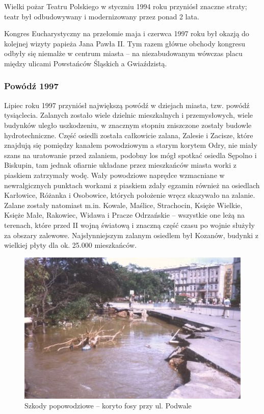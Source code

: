 \documentclass{article}
\begin{document}
Wielki pożar Teatru Polskiego w styczniu 1994 roku przyniósł znaczne straty; teatr był odbudowywany i modernizowany przez ponad 2 lata.

Kongres Eucharystyczny na przełomie maja i czerwca 1997 roku był okazją do kolejnej wizyty papieża Jana Pawła II. Tym razem główne obchody kongresu odbyły się niemalże w centrum miasta – na niezabudowanym wówczas placu między ulicami Powstańców Śląskich a Gwiaździstą.

\subsubsection{Powódź 1997}
Lipiec roku 1997 przyniósł największą powódź w dziejach miasta, tzw. powódź tysiąclecia. Zalanych zostało wiele dzielnic mieszkalnych i przemysłowych, wiele budynków uległo uszkodzeniu, w znacznym stopniu zniszczone zostały budowle hydrotechniczne. Część osiedli została całkowicie zalana, Zalesie i Zacisze, które znajdują się pomiędzy kanałem powodziowym a starym korytem Odry, nie miały szans na uratowanie przed zalaniem, podobny los mógł spotkać osiedla Sępolno i Biskupin, tam jednak ofiarnie układane przez mieszkańców miasta worki z piaskiem zatrzymały wodę. Wały powodziowe naprędce wzmacniane w newralgicznych punktach workami z piaskiem zdały egzamin również na osiedlach Karłowice, Różanka i Osobowice, których położenie wręcz skazywało na zalanie. Zalane zostały natomiast m.in. Kowale, Maślice, Strachocin, Księże Wielkie, Księże Małe, Rakowiec, Widawa i Pracze Odrzańskie – wszystkie one leżą na terenach, które przed II wojną światową i znaczną część czasu po wojnie służyły za obszary zalewowe. Najsłynniejszym zalanym osiedlem był Kozanów, budynki z wielkiej płyty dla ok. 25.000 mieszkańców.
 \begin{figure}[h!]
\centering
\includegraphics[scale=1]{20.jpg}
\caption{Szkody popowodziowe – koryto fosy przy ul. Podwale}
\end{figure}
\end{document}
